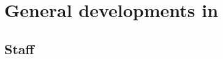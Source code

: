 

\newcommand{\AMark}{AIPSMark$^{(93)}$}
\newcommand{\AMarks}{AIPSMarks$^{(93)}$}
\newcommand{\LMark}{AIPSLoopMark$^{(93)}$}
\newcommand{\LMarks}{AIPSLoopMarks$^{(93)}$}
\newcommand{\AM}{A_m^{(93)}}
\newcommand{\ALM}{AL_m^{(93)}}

\newcommand{\AIPRELEASE}{October 15, 1996}
\newcommand{\AIPVOLUME}{Volume XVI}
\newcommand{\AIPNUMBER}{Number 2}
\newcommand{\RELEASENAME}{{\tt 15OCT96}}
\newcommand{\OLDNAME}{{\tt 15JAN96}}




\newcommand{\MYSpace}{-11pt}

\normalstyle
\vfill
\section{General developments in \AIPS}

\subsection{Staff}

